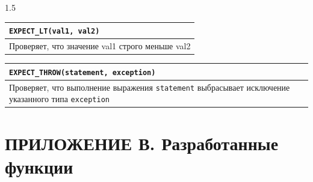 \documentclass[14pt,a4paper]{extarticle}
\begin{document}
\begin{spacing}{1.5}
\vspace{0.2cm}

\noindent\begin{tabularx}{\textwidth}{|X|}
\hline
\texttt{EXPECT\_LT(val1, val2)} \\
\hline
Проверяет, что значение val1 строго меньше val2 \\
\hline
\end{tabularx}

\vspace{0.2cm}

\noindent\begin{tabularx}{\textwidth}{|X|}
\hline
\texttt{EXPECT\_THROW(statement, exception)} \\
\hline
Проверяет, что выполнение выражения \texttt{statement} выбрасывает исключение указанного типа \texttt{exception} \\
\hline
\end{tabularx}

\end{spacing}

\newpage
\section*{ПРИЛОЖЕНИЕ В. Разработанные функции}
\end{document}
